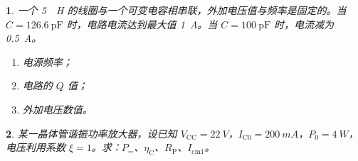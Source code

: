 \documentclass{ctexart}
\theoremstyle{change}
\newtheorem{ti}{}[section]
\begin{document}
\begin{ti}
	一个 \SI{5}{\upmu H} 的线圈与一个可变电容相串联，外加电压值与频率是固定的。当 $C = \SI{126.6}{\pF}$ 时，电路电流达到最大值 \SI{1}{A}。当 $C = \SI{100}{\pF}$ 时，电流减为 \SI{0.5}{A}。
	\begin{enumerate}
		\item 电源频率；
		\item 电路的 $Q$ 值；
		\item 外加电压数值。
	\end{enumerate}
\end{ti}

\begin{ti}
	某一晶体管谐振功率放大器，设已知 $V_{\mathrm{CC}} = \SI{22}{V}$，$I_{\mathrm{C}0} = \SI{200}{mA}$，$P_{0} = \SI{4}{W}$，电压利用系数 $\xi = 1$。求：$P_{=}$、$\eta_{\mathrm{C}}$、$R_{\mathrm{P}}$、$I_{\mathrm{cm}1}$。
\end{ti}
\end{document}
